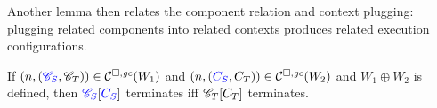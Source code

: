 Another lemma then relates the component relation and context plugging: plugging related components into related contexts produces related execution configurations.
\begin{lemma}
  \label{lem:adeq-context-plug}
  If $\npair{\stpair{\context}{\context}}\in\lrcomp(W_1)$ and $\npair{\stpair{\comp}{\comp}} \in \lrcomp(W_2)$ and $W_1\oplus W_2$ is defined, then
  ${\color{blue} \mathscr{C}_S}[{\color{blue} C_S}]$ terminates iff $\mathscr{C}_T[C_T]$ terminates.
\end{lemma}

